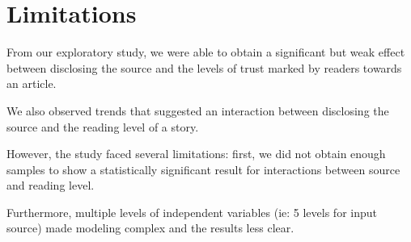 



 






\section{Limitations}

From our exploratory study, we were able to obtain a significant but weak effect between disclosing the source and the levels of trust marked by readers towards an article.

We also observed trends that suggested an interaction between disclosing the source and the reading level of a story.

However, the study faced several limitations: first, we did not obtain enough samples to show a statistically significant result for interactions between source and reading level.

Furthermore, multiple levels of independent variables (ie: 5 levels for input source) made modeling complex and the results less clear.

